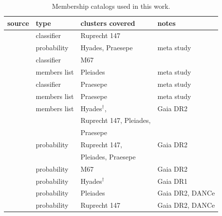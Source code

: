 \documentclass{aa}
\begin{document}
\begin{appendix}

\begin{table}
\caption{Membership catalogs used in this work.}
\label{tab:app:memberships}
\centering
\begin{tabular}{llll}     %
\hline\hline
     source  & type  & clusters covered & notes\\
\hline
   \citet{curtis2013} & classifier & Ruprecht 147 & \\
   \citet{douglas_praesepe_hyades_2014} & probability & Hyades, Praesepe & meta study \\
   \citet{gonzalez_m67mem_2016} & classifier & M67 & \\
   \citet{rebull_pleiadesrot_2016} & members list & Pleiades & meta study\\
   \citet{rebull_praesepe_2017} & classifier & Praesepe & meta study\\
   \citet{douglas_poking_2017} & members list & Praesepe & meta study\\
   \citet{gaia_dr2_2018_hrd} & members list & Hyades$^{\dagger}$,   & Gaia DR2\\%
   &&Ruprecht 147, Pleiades, &\\
   &&Praesepe&\\
   \citet{cantat_gaudin_2018} & probability & Ruprecht 147, & Gaia DR2\\%
   && Pleiades, Praesepe&\\
   \citet{gao_m67mem_2018} & probability & M67 & Gaia DR2\\
   \citet{reino_hyades_2018} & probability & Hyades$^{\dagger}$ & Gaia DR1\\
   \citet{olivares_pleiades_2018} & probability & Pleiades & Gaia DR2, DANCe\\
   \citet{olivares_ngc6774_2019} & probability & Ruprecht 147 & Gaia DR2, DANCe\\
\hline
\end{tabular}
\end{table}


\end{appendix}
\end{document}
